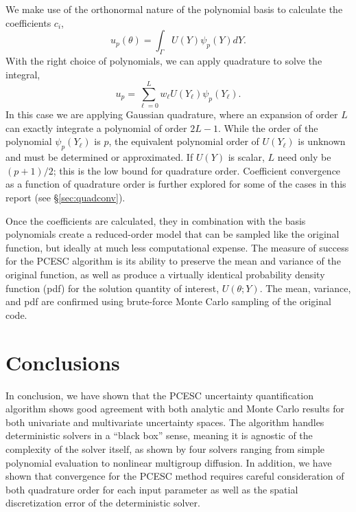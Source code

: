 \documentclass[11pt]{article} %
\begin{document}
We make use of the orthonormal nature of the polynomial basis to calculate the coefficients $c_i$,
\begin{equation}
u_p(\theta) = \int_\Gamma U(Y)\psi_p(Y)dY.
\end{equation}
With the right choice of polynomials, we can apply quadrature to solve the integral,
\begin{equation}
u_p = \sum_{\ell=0}^{L} w_\ell U(Y_\ell) \psi_p(Y_\ell).
\end{equation}
In this case we are applying Gaussian quadrature, where an expansion of order $L$ can exactly integrate a polynomial of order $2L-1$.  While the order of the polynomial $\psi_p(Y_\ell)$ is $p$, the equivalent polynomial order of $U(Y_\ell)$ is unknown and must be determined or approximated.  If $U(Y)$ is scalar, $L$ need only be $(p+1)/2$; this is the low bound for quadrature order.  Coefficient convergence as a function of quadrature order is further explored for some of the cases in this report (see \S \ref{sec:quadconv}).

Once the coefficients are calculated, they in combination with the basis polynomials create a reduced-order model that can be sampled like the original function, but ideally at much less computational expense.  The measure of success for the PCESC algorithm is its ability to preserve the mean and variance of the original function, as well as produce a virtually identical probability density function (pdf) for the solution quantity of interest, $U(\theta;Y)$.  The mean, variance, and pdf are confirmed using brute-force Monte Carlo sampling of the original code.






%
%
%
%
\section{Conclusions}
In conclusion, we have shown that the PCESC uncertainty quantification algorithm shows good agreement with both analytic and Monte Carlo results for both univariate and multivariate uncertainty spaces.  The algorithm handles deterministic solvers in a ``black box'' sense, meaning it is agnostic of the complexity of the solver itself, as shown by four solvers ranging from simple polynomial evaluation to nonlinear multigroup diffusion.  In addition, we have shown that convergence for the PCESC method requires careful consideration of both quadrature order for each input parameter as well as the spatial discretization error of the deterministic solver.
\end{document}

